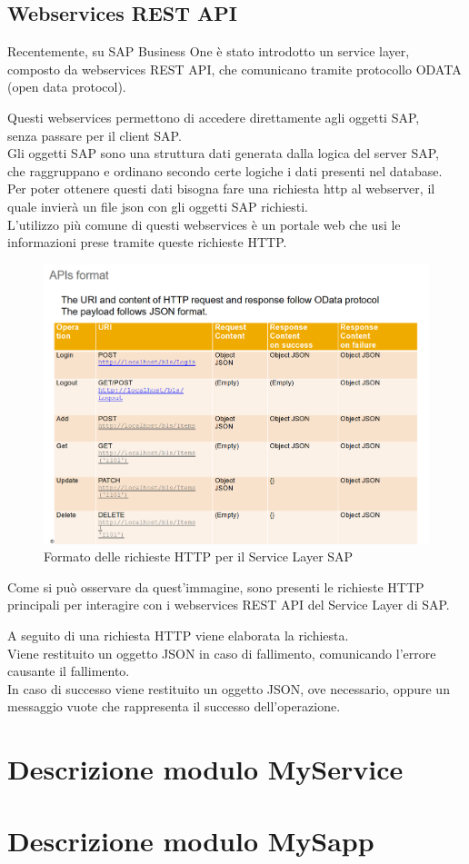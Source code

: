 \subsection{Webservices REST API}
\begin{flushleft}
	\item Recentemente, su SAP Business One è stato introdotto un service layer, composto da webservices REST API, che comunicano tramite protocollo ODATA (open data protocol).
	\item Questi webservices permettono di accedere direttamente agli oggetti SAP,\\senza passare per il client SAP.\\Gli oggetti SAP sono una struttura dati generata dalla logica del server SAP, \\che raggruppano e ordinano secondo certe logiche i dati presenti nel database.
	\\ Per poter ottenere questi dati bisogna fare una richiesta http al webserver, il quale invierà un file json con gli oggetti SAP richiesti.
	\\L'utilizzo più comune di questi webservices è un portale web che usi le informazioni prese tramite queste richieste HTTP. 
\end{flushleft}
\begin{figure}[!h] 
	\centering 
	\includegraphics[scale = 0.37]{immagini/api_Format.png} 
	\caption {Formato delle richieste HTTP per il Service Layer SAP}
\end{figure}
\begin{flushleft}
	\item Come si può osservare da quest'immagine, sono presenti le richieste HTTP principali per interagire con i webservices REST API del Service Layer di SAP.
	\item A seguito di una richiesta HTTP viene elaborata la richiesta.\\Viene restituito un oggetto JSON in caso di fallimento, comunicando l'errore causante il fallimento.\\In caso di successo viene restituito un oggetto JSON, ove necessario, oppure un messaggio vuote che rappresenta il successo dell'operazione.
\end{flushleft}
\section{Descrizione modulo MyService}
\section{Descrizione modulo MySapp}

